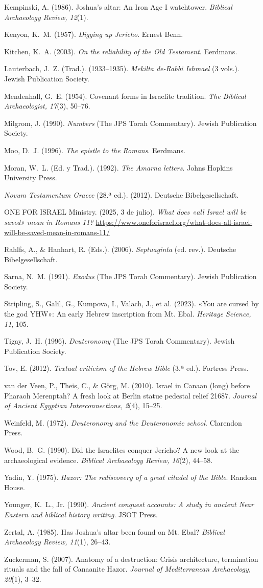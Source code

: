 \documentclass[11pt,letterpaper]{article}
\newcommand{\refapa}[1]{\par{\RaggedRight\hangindent=1.27cm\hangafter=1\noindent #1\par}\vspace{4pt}}
\begin{document}
{\refapa{Kempinski, A. (1986). Joshua's altar: An Iron Age I watchtower. \emph{Biblical Archaeology Review, 12}(1).}
\refapa{Kenyon, K.~M. (1957). \emph{Digging up Jericho}. Ernest Benn.}
\refapa{Kitchen, K.~A. (2003). \emph{On the reliability of the Old Testament}. Eerdmans.}
\refapa{Lauterbach, J.~Z. (Trad.). (1933--1935). \emph{Mekilta de-Rabbi Ishmael} (3 vols.). Jewish Publication Society.}
\refapa{Mendenhall, G.~E. (1954). Covenant forms in Israelite tradition. \emph{The Biblical Archaeologist, 17}(3), 50--76.}
\refapa{Milgrom, J. (1990). \emph{Numbers} (The JPS Torah Commentary). Jewish Publication Society.}
\refapa{Moo, D.~J. (1996). \emph{The epistle to the Romans}. Eerdmans.}
\refapa{Moran, W.~L. (Ed. y Trad.). (1992). \emph{The Amarna letters}. Johns Hopkins University Press.}
\refapa{\emph{Novum Testamentum Graece} (28.ª ed.). (2012). Deutsche Bibelgesellschaft.}
\refapa{ONE FOR ISRAEL Ministry. (2025, 3 de julio). \emph{What does «all Israel will be saved» mean in Romans 11?} \url{https://www.oneforisrael.org/what-does-all-israel-will-be-saved-mean-in-romans-11/}}
\refapa{Rahlfs, A., \& Hanhart, R. (Eds.). (2006). \emph{Septuaginta} (ed. rev.). Deutsche Bibelgesellschaft.}
\refapa{Sarna, N.~M. (1991). \emph{Exodus} (The JPS Torah Commentary). Jewish Publication Society.}
\refapa{Stripling, S., Galil, G., Kumpova, I., Valach, J., et al. (2023). «You are cursed by the god YHW»: An early Hebrew inscription from Mt. Ebal. \emph{Heritage Science, 11}, 105.}
\refapa{Tigay, J.~H. (1996). \emph{Deuteronomy} (The JPS Torah Commentary). Jewish Publication Society.}
\refapa{Tov, E. (2012). \emph{Textual criticism of the Hebrew Bible} (3.ª ed.). Fortress Press.}
\refapa{van der Veen, P., Theis, C., \& Görg, M. (2010). Israel in Canaan (long) before Pharaoh Merenptah? A fresh look at Berlin statue pedestal relief 21687. \emph{Journal of Ancient Egyptian Interconnections, 2}(4), 15--25.}
\refapa{Weinfeld, M. (1972). \emph{Deuteronomy and the Deuteronomic school}. Clarendon Press.}
\refapa{Wood, B.~G. (1990). Did the Israelites conquer Jericho? A new look at the archaeological evidence. \emph{Biblical Archaeology Review, 16}(2), 44--58.}
\refapa{Yadin, Y. (1975). \emph{Hazor: The rediscovery of a great citadel of the Bible}. Random House.}
\refapa{Younger, K.~L., Jr. (1990). \emph{Ancient conquest accounts: A study in ancient Near Eastern and biblical history writing}. JSOT Press.}
\refapa{Zertal, A. (1985). Has Joshua's altar been found on Mt. Ebal? \emph{Biblical Archaeology Review, 11}(1), 26--43.}
\refapa{Zuckerman, S. (2007). Anatomy of a destruction: Crisis architecture, termination rituals and the fall of Canaanite Hazor. \emph{Journal of Mediterranean Archaeology, 20}(1), 3--32.}
}
\end{document}
